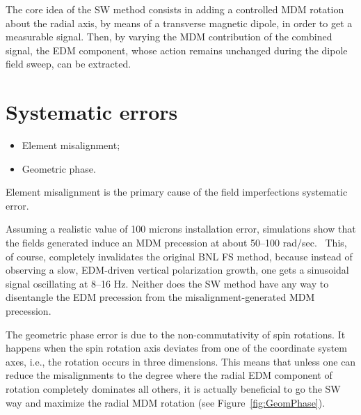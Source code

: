 \documentclass{article}
\begin{document}
The core idea of the SW method consists in adding a controlled MDM rotation about the radial axis, by means of a transverse magnetic dipole, in order to get a measurable signal. Then, by varying the MDM contribution of the combined signal, the EDM component, whose action remains unchanged during the dipole field sweep, can be extracted.

\section{Systematic errors}
\begin{itemize}
\item Element misalignment;
\item Geometric phase.
\end{itemize}

Element misalignment is the primary cause of the field imperfections systematic error.~\cite[p. 24]{BNL_proposal}

Assuming a realistic value of 100 microns installation error, simulations show that the fields generated induce an MDM precession at about 50--100 rad/sec.~\cite{Senichev:FDM} This, of course, completely invalidates the original BNL FS method, because instead of observing a slow, EDM-driven vertical polarization growth, one gets a sinusoidal signal oscillating at 8--16 Hz. Neither does the SW method have any way to disentangle the EDM precession from the misalignment-generated MDM precession.

The geometric phase error is due to the non-commutativity of spin rotations. It happens when the spin rotation axis deviates from one of the coordinate system axes, i.e., the rotation occurs in three dimensions. This means that unless one can reduce the misalignments to the degree where the radial EDM component of rotation completely dominates all others, it is actually beneficial to go the SW way and maximize the radial MDM rotation (see Figure~\ref{fig:GeomPhase}).
\end{document}
